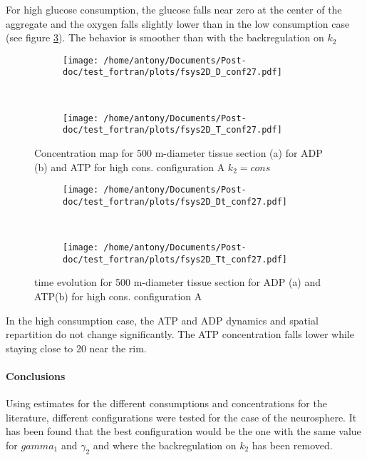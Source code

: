 \documentclass[11pt,a4paper]{article}
\begin{document}
For high glucose consumption, the glucose falls near zero at the center of the aggregate and the oxygen falls slightly lower than in the low consumption case (see figure \ref{conf27}). The behavior is smoother than with the backregulation on $k_2$ 

\begin{figure}[ht!]
	\begin{subfigure}{0.45\textwidth}
	\centering
	\texttt{[image: /home/antony/Documents/Post-doc/test\_fortran/plots/fsys2D\_D\_conf27.pdf]}
	\caption{ \label{D_conf27}}
	\end{subfigure}
	~~
	\begin{subfigure}{0.45\textwidth}
	\texttt{[image: /home/antony/Documents/Post-doc/test\_fortran/plots/fsys2D\_T\_conf27.pdf]}
		\caption{ \label{T_conf27}}
	\end{subfigure}
	\caption{Concentration map for 500 \textmu m-diameter tissue section  (a) for ADP (b) and ATP \label{conf27} for high cons. configuration A $k_2 = cons$}
\end{figure} 

\begin{figure}[ht!]
	\begin{subfigure}{0.45\textwidth}
	\centering
	\texttt{[image: /home/antony/Documents/Post-doc/test\_fortran/plots/fsys2D\_Dt\_conf27.pdf]}
	\caption{ \label{Dt_conf27}}
	\end{subfigure}
	~~
	\begin{subfigure}{0.45\textwidth}
	\texttt{[image: /home/antony/Documents/Post-doc/test\_fortran/plots/fsys2D\_Tt\_conf27.pdf]}
		\caption{ \label{Tt_conf27}}
	\end{subfigure}
	\caption{time evolution for 500 \textmu m-diameter tissue section  for ADP (a) and  ATP(b) for high cons. configuration A \label{tconf27}}
\end{figure}

In the high consumption case, the ATP and ADP dynamics and spatial repartition do not change significantly. The ATP concentration falls lower while staying close to 20 near the rim. 


\paragraph{Conclusions}
Using estimates for the different consumptions and concentrations for the literature, different configurations were tested for the case of the neurosphere. It has been found that the best configuration would be the one with the same value for $gamma_1$ and $\gamma_2$ and where the backregulation on $k_2$ has been removed.
\end{document}
